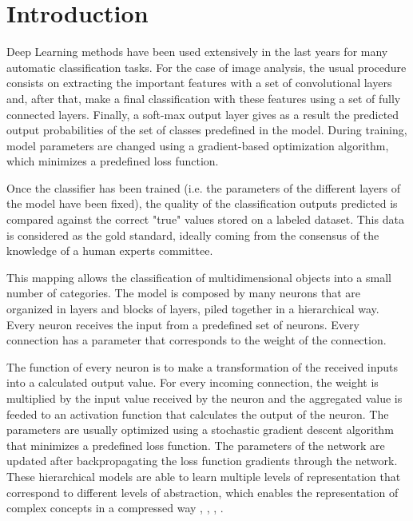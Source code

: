 \documentclass[preprint]{elsarticle}
\theoremstyle{definition} %
\theoremstyle{remark}
\begin{document}
\section{Introduction}

Deep Learning methods have been used extensively in the last years for many automatic classification tasks. For the case of image analysis, the usual procedure consists on extracting the important features with a set of convolutional layers and, after that, make a final classification with these features using a set of fully connected layers. Finally, a soft-max output layer gives as a result the predicted output probabilities of the set of classes predefined in the model. During training, model parameters are changed using a gradient-based optimization algorithm, which minimizes a predefined loss function. 

Once the classifier has been trained (i.e. the parameters of the different layers of the model have been fixed), the quality of the classification outputs predicted is compared against the correct "true" values stored on a labeled dataset. This data is considered as the gold standard, ideally coming from the consensus of the knowledge of a human experts committee.

This mapping allows the classification of multidimensional objects into a small number of categories. The model is composed by many neurons that are organized in layers and blocks of layers, piled together in a hierarchical way. Every neuron receives the input from a predefined set of neurons. Every connection has a parameter that corresponds to the weight of the connection. 

The function of every neuron is to make a transformation of the received inputs into a calculated output value. For every incoming connection, the weight is multiplied by the input value received by the neuron and the aggregated value is feeded to an activation function that calculates the output of the neuron. The parameters are usually optimized using a stochastic gradient descent algorithm that minimizes a predefined loss function. The parameters of the network are updated after backpropagating the loss function gradients through the network. These hierarchical models are able to learn multiple levels of representation that correspond to different levels of abstraction, which enables the representation of complex concepts in a compressed way \cite{nature-deep-learning}, \cite{888}, \cite{Bengio:2013:RLR:2498740.2498889}, \cite{bengio-2009}.
 
\end{document}
